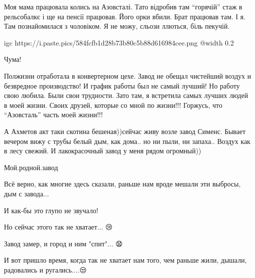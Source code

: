 Моя мама працювала колись на Азовсталі. Тато відробив там \enquote{горячій} стаж в
рельсобалкє і ще на пенсії працював. Його орки вбили. Брат працював там. І я.
Там познайомилася з чоловіком. Я не можу, сльози ллються, біль пекучій.


\ifcmt
  igc https://i.paste.pics/584fcfb1d28b73b80c5b88d616984cee.png
	@width 0.2
\fi


Чума!


Полжизни отработала в конвертерном цехе. Завод не обещал чистейший воздух и
безвредное производство! И график работы был не самый лучший! Но работу свою
любила. Были свои трудности. Зато там, я встретила самых лучших людей в моей
жизни. Своих друзей, которые со мной по жизни!!! Горжусь, что \enquote{Азовсталь} часть
моей жизни!!!


А Ахметов акт таки скотина бешеная))сейчас живу возле завод Сименс. Бывает
вечером вижу с трубы белый дым, как дома.. но ни пыли, ни запаха.. Воздух как в
лесу свежий. И лакокрасочный завод у меня рядом огромный))


Мой.родной.завод


Всё верно, как многие здесь сказали, раньше нам вроде мешали эти выбросы, дым с
завода...

И как-бы это глупо не звучало!

Но сейчас этого так не хватает... 😢

Завод замер, и город и ним "спит"... 😧

И вот пришло время, когда так не хватает нам того, чем раньше жили, дышали,
радовались и ругались....😒
